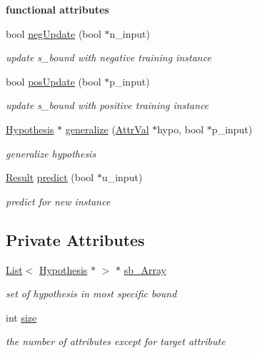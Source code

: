 \begin{Indent}{\bf functional attributes}\par
\begin{DoxyCompactItemize}
\item 
bool \hyperlink{class_s___bound_a022c42224af39423c1251ca345fe31de}{neg\-Update} (bool $\ast$n\-\_\-input)
\begin{DoxyCompactList}\small\item\em update s\-\_\-bound with negative training instance \end{DoxyCompactList}\item 
bool \hyperlink{class_s___bound_a819f6cff5025a4916e6c1e5c798721f5}{pos\-Update} (bool $\ast$p\-\_\-input)
\begin{DoxyCompactList}\small\item\em update s\-\_\-bound with positive training instance \end{DoxyCompactList}\item 
\hyperlink{class_hypothesis}{Hypothesis} $\ast$ \hyperlink{class_s___bound_a28f0422a496646053461879bd46ab787}{generalize} (\hyperlink{concept_8h_a9680d29b8d997e4adbf99481b65e897d}{Attr\-Val} $\ast$hypo, bool $\ast$p\-\_\-input)
\begin{DoxyCompactList}\small\item\em generalize hypothesis \end{DoxyCompactList}\item 
\hyperlink{concept_8h_a28287671eaf7406afd604bd055ba4066}{Result} \hyperlink{class_s___bound_a4bea23a52a99756a86c7c883a578ae40}{predict} (bool $\ast$u\-\_\-input)
\begin{DoxyCompactList}\small\item\em predict for new instance \end{DoxyCompactList}\end{DoxyCompactItemize}
\end{Indent}
\subsection*{Private Attributes}
\begin{DoxyCompactItemize}
\item 
\hyperlink{class_list}{List}$<$ \hyperlink{class_hypothesis}{Hypothesis} $\ast$ $>$ $\ast$ \hyperlink{class_s___bound_a2fa303e4f1e4c2df793e1474f0aa6481}{sb\-\_\-\-Array}
\begin{DoxyCompactList}\small\item\em set of hypothesis in most specific bound \end{DoxyCompactList}\item 
int \hyperlink{class_s___bound_a9742961078971270b164bb793b64ee06}{size}
\begin{DoxyCompactList}\small\item\em the number of attributes except for target attribute \end{DoxyCompactList}\end{DoxyCompactItemize}
